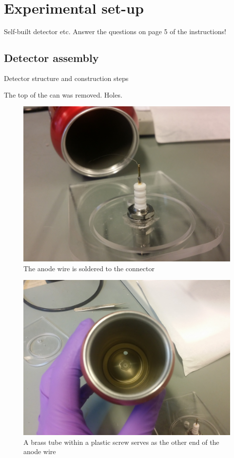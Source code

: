 \documentclass[a4paper]{article}
\begin{document}
\section{Experimental set-up}
Self-built detector etc.
Answer the questions on page 5 of the instructions!


\subsection{Detector assembly}
Detector structure and construction steps

The top of the can was removed.
Holes.

\begin{figure}[ht!]
\centering
\includegraphics[width=\textwidth]{fig/IMG_20201117_121044.jpg}
\caption{The anode wire is soldered to the connector}
\end{figure}

\begin{figure}[ht!]
\centering
\includegraphics[width=\textwidth]{fig/IMG_20201123_103327.jpg}
\caption{A brass tube within a plastic screw serves as the other end of the anode wire}
\end{figure}
\end{document}
